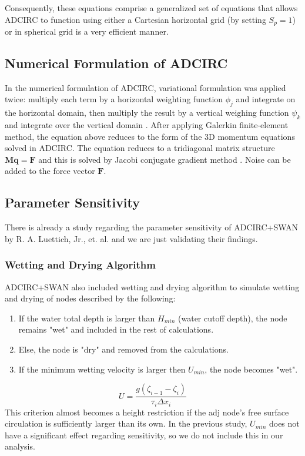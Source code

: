 \documentclass[a4paper, 10pt]{article}
\begin{document}
	Consequently, these equations comprise a generalized set of equations that allows ADCIRC to function using either a Cartesian horizontal grid (by setting $S_p = 1$) or in spherical grid \cite{bib:num} is a very efficient manner.
	
	\subsection{Numerical Formulation of ADCIRC}
	In the numerical formulation of ADCIRC, variational formulation was applied twice: multiply each term by a horizontal weighting function $\phi_j$ and integrate on the horizontal domain, then multiply the result by a vertical weighing function $\psi_k$ and integrate over the vertical domain \cite{bib:num}. After applying Galerkin finite-element method, the equation above reduces to the form of the 3D momentum equations solved in ADCIRC. The equation reduces to a tridiagonal matrix structure $\mathbf{Mq = F}$ and this is solved by Jacobi conjugate gradient method \cite{bib:num}. Noise can be added to the force vector $\mathbf{F}$.
	
	\subsection{Parameter Sensitivity}
	There is already a study \cite{bib:wetdry} regarding the parameter sensitivity of ADCIRC+SWAN by R. A. Luettich, Jr., et. al. and we are just validating their findings.
	\subsubsection{Wetting and Drying Algorithm}
	ADCIRC+SWAN also included wetting and drying algorithm to simulate wetting and drying of nodes described by the following:
	\begin{enumerate}
		\item If the water total depth is larger than $H_{min}$ (water cutoff depth), the node remains "wet" and included in the rest of calculations.
		\item Else, the node is "dry" and removed from the calculations.
		\item If the minimum wetting velocity is larger then $U_{min}$, the node becomes "wet".
	\end{enumerate}
	\begin{equation*}
	U = \frac{g\left(\zeta_{i-1} - \zeta_i\right)}{\tau_i \Delta x_i}
	\end{equation*}
	This criterion almost becomes a height restriction if the adj node's free surface circulation is sufficiently larger than its own. In the previous study, $U_{min}$ does not have a significant effect regarding sensitivity, so we do not include this in our analysis.
	
\end{document}
